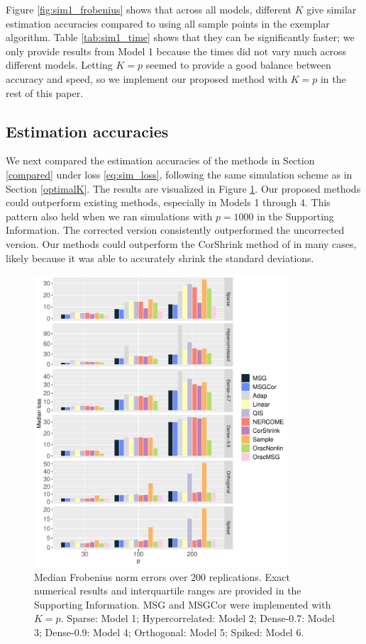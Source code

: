 \documentclass[useAMS,referee,usenatbib]{biom}
\begin{document}
Figure \ref{fig:sim1_frobenius} shows that across all models, different $K$ give similar estimation accuracies compared to using all sample points in the exemplar algorithm. Table \ref{tab:sim1_time} shows that they can be significantly faster; we only provide results from Model 1 because the times did not vary much across different models. Letting $K = p$ seemed to provide a good balance between accuracy and speed, so we implement our proposed method with $K = p$ in the rest of this paper.

\subsection{\label{sec:accuracies}Estimation accuracies}

We next compared the estimation accuracies of the methods in Section \ref{compared} under loss \eqref{eq:sim_loss}, following the same simulation scheme as in Section \ref{optimalK}. The results are visualized in Figure \ref{fig:sim2_frobenius}. Our proposed methods could outperform existing methods, especially in Models 1 through 4. This pattern also held when we ran simulations with $p = 1000$ in the Supporting Information. The corrected version consistently outperformed the uncorrected version. Our methods could outperform the CorShrink method of \citet{dey2018corshrink} in many cases, likely because it was able to accurately shrink the standard deviations.

\begin{figure}
\begin{center}
\centerline{  \includegraphics[width=0.85\textwidth]{img/sim2_frobenius.pdf}}
\end{center}
\caption{Median Frobenius norm errors over 200 replications. Exact numerical results and interquartile ranges are provided in the Supporting Information. MSG and MSGCor were implemented with $K = p$. Sparse: Model 1; Hypercorrelated: Model 2; Dense-0.7: Model 3; Dense-0.9: Model 4; Orthogonal: Model 5; Spiked: Model 6.}
\label{fig:sim2_frobenius}
\end{figure}
\end{document}
